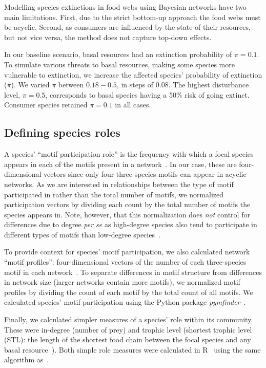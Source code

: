 \documentclass[12pt]{article}
\begin{document}
\begin{spacing}{2.0}
		
		Modelling species extinctions in food webs using Bayesian networks have two main limitations. First, due to the strict bottom-up approach the food webs must be acyclic. 
		Second, as consumers are influenced by the state of their resources, but not vice versa, the method does not capture top-down effects.
		
        In our baseline scenario, basal resources had an extinction probability of $\pi = 0.1$. 
		To simulate various threats to basal resources, making some species more vulnerable to extinction, we increase the affected species' probability of extinction ($\pi$). 
		We varied $\pi$ between $0.18-0.5$, in steps of $0.08$. 
		The highest disturbance level, $\pi = 0.5$, corresponds to basal species having a 50\% risk of going extinct. 
		Consumer species retained $\pi=0.1$ in all cases.
		
		
	\subsection*{Defining species roles}

        A species' ``motif participation role'' is the frequency with which a focal species appears in each of the motifs present in a network~\citep{Stouffer2012}.
        In our case, these are four-dimensional vectors since only four three-species motifs can appear in acyclic networks.
        As we are interested in relationships between the type of motif participated in rather than the total number of motifs, we normalized participation vectors by dividing each count by the total number of motifs the species appears in.
        Note, however, that this normalization does \emph{not} control for differences due to degree \emph{per se} as high-degree species also tend to participate in different types of motifs than low-degree species~\citep{Cirtwill2021_inprep}.
        
        
        To provide context for species' motif participation, we also calculated network ``motif profiles'': four-dimensional vectors of the number of each three-species motif in each network~\citep{Stouffer2012}.
        To separate differences in motif structure from differences in network size (larger networks contain more motifs), we normalized motif profiles by dividing the count of each motif by the total count of all motifs. 
		We calculated species' motif participation using the Python package \emph{pymfinder}~\citep{pymfinder}.


        Finally, we calculated simpler measures of a species' role within its community.
        These were in-degree (number of prey) and trophic level (shortest trophic level (STL): the length of the shortest food chain between the focal species and any basal resource~\citep{Williams2004}).
        Both simple role measures were calculated in R~\citep{R} using the same algorithm as~\citet{Eklof2013}.
        



\end{spacing}
\end{document}
